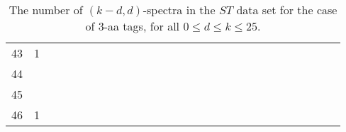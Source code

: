 \documentclass{article}
\begin{document}
\begin{table}[h]
{\begin{tabular}{|c|c|
c|c|c|c|c|c|c|c|c|c|c|c|c|c|c|c|c|c|c|c|c|c|c|c|c|c|}
43  & 1 &  &  &  &  &  &  &  &  &  &  &  &  &  &  &  &  &  &  &  &  &  &  &  &  &  & \\

44  &  &  &  &  &  &  &  &  &  &  &  &  &  &  &  &  &  &  &  &  &  &  &  &  &  &  & \\

45  &  &  &  &  &  &  &  &  &  &  &  &  &  &  &  &  &  &  &  &  &  &  &  &  &  &  & \\

46  & 1 &  &  &  &  &  &  &  &  &  &  &  &  &  &  &  &  &  &  &  &  &  &  &  &  &  & \\

  \hline
\end{tabular}
\par}
\centering
\caption{The number of $(k-d,d)$-spectra in the $ST$ data set for the case of 3-aa tags, for all $0\le d\le k\le 25$.}
\vspace{3mm}
\label{table:kd-1-ST}
\end{table}
\end{document}
